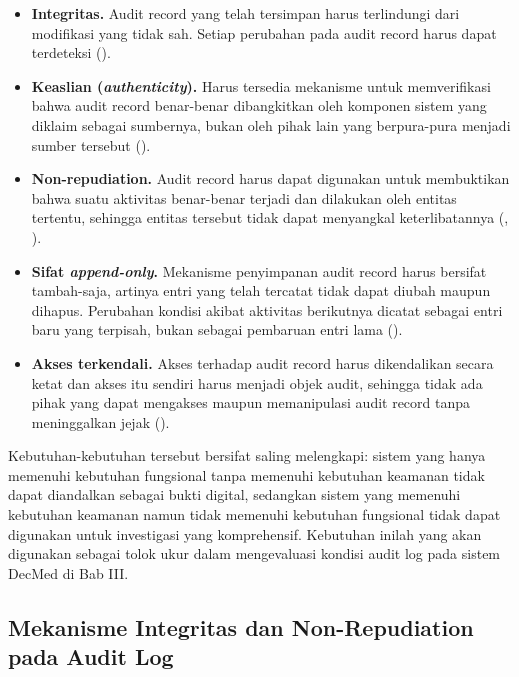 \begin{itemize}
    \item \textbf{Integritas.} Audit record yang telah tersimpan harus
    terlindungi dari modifikasi yang tidak sah. Setiap perubahan pada
    audit record harus dapat terdeteksi (\cite{iso27789_2021}).

    \item \textbf{Keaslian (\textit{authenticity}).} Harus tersedia
    mekanisme untuk memverifikasi bahwa audit record benar-benar
    dibangkitkan oleh komponen sistem yang diklaim sebagai sumbernya,
    bukan oleh pihak lain yang berpura-pura menjadi sumber tersebut
    (\cite{iso27789_2021}).

    \item \textbf{Non-repudiation.} Audit record harus dapat digunakan
    untuk membuktikan bahwa suatu aktivitas benar-benar terjadi dan
    dilakukan oleh entitas tertentu, sehingga entitas tersebut tidak
    dapat menyangkal keterlibatannya (\cite{shostack2014},
    \cite{iso27789_2021}).

    \item \textbf{Sifat \textit{append-only}.} Mekanisme penyimpanan
    audit record harus bersifat tambah-saja, artinya entri yang telah
    tercatat tidak dapat diubah maupun dihapus. Perubahan kondisi
    akibat aktivitas berikutnya dicatat sebagai entri baru yang
    terpisah, bukan sebagai pembaruan entri lama (\cite{iso27789_2021}).

    \item \textbf{Akses terkendali.} Akses terhadap audit record harus
    dikendalikan secara ketat dan akses itu sendiri harus menjadi
    objek audit, sehingga tidak ada pihak yang dapat mengakses
    maupun memanipulasi audit record tanpa meninggalkan jejak
    (\cite{iso27789_2021}).
\end{itemize}

Kebutuhan-kebutuhan tersebut bersifat saling melengkapi: sistem yang
hanya memenuhi kebutuhan fungsional tanpa memenuhi kebutuhan keamanan
tidak dapat diandalkan sebagai bukti digital, sedangkan sistem yang
memenuhi kebutuhan keamanan namun tidak memenuhi kebutuhan fungsional
tidak dapat digunakan untuk investigasi yang komprehensif. Kebutuhan
inilah yang akan digunakan sebagai tolok ukur dalam mengevaluasi
kondisi audit log pada sistem DecMed di Bab III.

\subsection{Mekanisme Integritas dan Non-Repudiation pada Audit Log}
\label{subsec:mekanisme-integritas}

